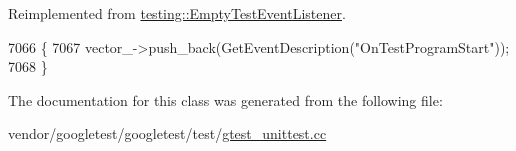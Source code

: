 Reimplemented from \hyperlink{classtesting_1_1EmptyTestEventListener_aa3847c8a3c22d8d69a6006dfdd6589fc}{testing\+::\+Empty\+Test\+Event\+Listener}.


\begin{DoxyCode}
7066                                                      \{
7067     vector\_->push\_back(GetEventDescription(\textcolor{stringliteral}{"OnTestProgramStart"}));
7068   \}
\end{DoxyCode}


The documentation for this class was generated from the following file\+:\begin{DoxyCompactItemize}
\item 
vendor/googletest/googletest/test/\hyperlink{gtest__unittest_8cc}{gtest\+\_\+unittest.\+cc}\end{DoxyCompactItemize}
